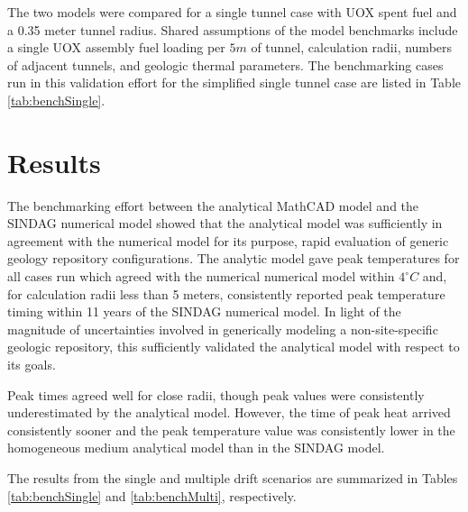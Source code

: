 The two models were compared for a single tunnel case with UOX spent fuel and a 
0.35 meter tunnel radius. Shared assumptions of the model benchmarks include a 
single UOX assembly fuel loading per $5m$ of tunnel, calculation radii, numbers 
of adjacent tunnels, and geologic thermal parameters. The benchmarking cases 
run in this validation effort for the simplified single 
tunnel case are listed in Table \ref{tab:benchSingle}. 


\section{Results}
The benchmarking effort between the analytical MathCAD model and the 
\gls{SINDAG} numerical  model showed that the analytical model was sufficiently 
in agreement with the numerical model for its purpose, rapid evaluation of 
generic geology repository configurations.  The analytic model gave peak 
temperatures for all cases run which agreed with the numerical numerical model 
within $4^{\circ}C$ and, for calculation radii less than 5 meters, consistently 
reported peak temperature timing within 11 years of the \gls{SINDAG} numerical 
model. In light of the magnitude of uncertainties involved in generically 
modeling a non-site-specific geologic repository, this sufficiently validated 
the analytical model with respect to its goals.

Peak times agreed well for close radii, though peak values were consistently 
underestimated by the analytical model. However, the time of peak heat arrived 
consistently sooner and the peak temperature value was consistently lower in the 
homogeneous medium analytical model than in the \gls{SINDAG} model. 

The results from the single and multiple drift scenarios are summarized in 
Tables \ref{tab:benchSingle} and \ref{tab:benchMulti}, respectively. 


